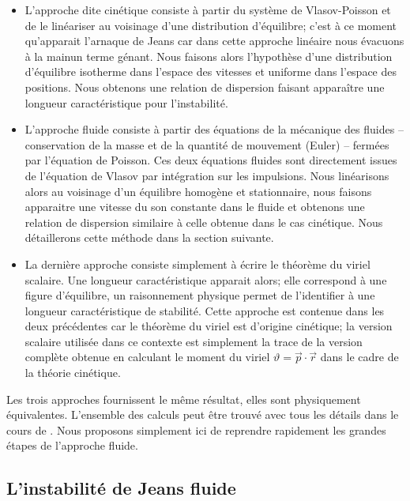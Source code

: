 \begin{itemize}

	\item L'approche dite cinétique consiste à partir du système de Vlasov-Poisson et de le linéariser au voisinage d'une distribution
		d'équilibre; c'est à ce moment qu'apparait l'arnaque de Jeans car dans cette approche linéaire nous évacuons \og{}à la main\fg un terme génant.
		Nous faisons alors l'hypothèse d'une distribution d'équilibre isotherme dans l'espace des vitesses et uniforme dans l'espace des
		positions. Nous obtenons une relation de dispersion faisant apparaître une longueur caractéristique pour l'instabilité.

	\item L'approche fluide consiste à partir des équations de la mécanique des fluides  -- conservation de la masse et de la quantité de
		mouvement (Euler) -- fermées par l'équation de Poisson. Ces deux équations fluides sont directement issues de l'équation de Vlasov par
		intégration sur les impulsions. Nous linéarisons alors au voisinage d'un équilibre homogène et stationnaire, nous faisons apparaitre
		une vitesse du son constante dans le fluide et obtenons une relation de dispersion similaire à celle obtenue dans le cas
		cinétique. Nous détaillerons cette méthode dans la section suivante.

	\item La dernière approche consiste simplement à écrire le théorème du viriel scalaire. Une longueur caractéristique apparait alors; elle
		correspond  à une figure d'équilibre, un raisonnement physique permet de l'identifier à une longueur caractéristique de stabilité.
		Cette approche est contenue dans les deux précédentes car le théorème du viriel est d'origine cinétique; la version scalaire utilisée
		dans ce contexte est simplement la trace de la version complète obtenue en calculant le moment du viriel $\vartheta=\vec p \cdot \vec
		r$ dans le cadre de la théorie cinétique.

\end{itemize}

Les trois approches fournissent le même résultat, elles sont physiquement
équivalentes. L'ensemble des calculs peut être trouvé avec tous les détails dans le cours de \cite{CoursJP}. Nous proposons simplement ici
de reprendre rapidement les grandes étapes de l'approche fluide.

\subsection{L'instabilité de Jeans fluide}
\label{Sec::Jeans}

